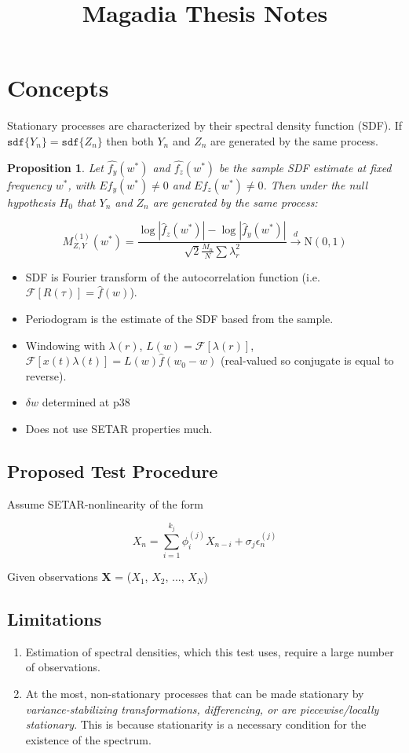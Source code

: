 \documentclass{article}
\title{Magadia Thesis Notes}
\newtheorem{proposition}{Proposition}
\newcommand{\Fourier}{\boldsymbol{\mathcal{F}}}
\begin{document}
\section{Concepts}
Stationary processes are characterized by their spectral density function
(SDF). If $\texttt{sdf}\{Y_{n}\} = \texttt{sdf}\{Z_{n}\}$ then both $Y_{n}$ and
$Z_{n}$ are generated by the same process.

\begin{proposition}
Let $\hat{f_{y}}(w^{*})$ and $\hat{f_{z}}(w^{*})$ be the sample SDF estimate at
fixed frequency $w^{*}$, with $E f_{y}(w^{*}) \neq 0$ and $E f_{z}(w^{*}) \neq
0$. Then under the null hypothesis $H_{0}$ that $Y_{n}$ and $Z_{n}$ are
generated by the same process: 

\[ M_{Z,Y}^{(1)}(w^{*}) = \frac{\log |\hat{f}_{z}(w^{*})| - \log
|\hat{f}_{y}(w^{*})|}{\sqrt{2} \frac{M_{n}}{N} \sum \lambda_{r}^{2}} 
  \overset{d}{\rightarrow} \mathrm{N}(0, 1)\]
\end{proposition}


\begin{itemize}
\item SDF is Fourier transform of the autocorrelation function
(i.e. $\Fourier [R(\tau)] = \hat{f}(w)$).
\item Periodogram is the estimate of the SDF based from the sample.
\item Windowing with $\lambda(r)$, $L(w) = \Fourier [\lambda(r)]$, $\Fourier
[x(t) \lambda(t)] = L(w) \hat{f}(w_{0} - w)$ (real-valued so conjugate is equal
to reverse).
\item $\delta w$ determined at p38
\item Does not use SETAR properties much.
\end{itemize}

\subsection{Proposed Test Procedure}
Assume SETAR-nonlinearity of the form

\[ X_n = \sum_{i=1}^{k_j} \phi_{i}^{(j)} X_{n-i} + \sigma_j \epsilon^{(j)}_n \]

\noindent Given observations \textbf{X} = ($X_1$, $X_2$, ..., $X_N$)


\subsection{Limitations}
\begin{enumerate}
\item Estimation of spectral densities, which this test uses, require a large 
number of observations.
\item At the most, non-stationary processes that can be made stationary
by \emph{variance-stabilizing transformations, differencing, or are
piecewise/locally stationary}. This is because stationarity is a necessary 
condition for the existence of the spectrum.
\end{enumerate}
\end{document}
